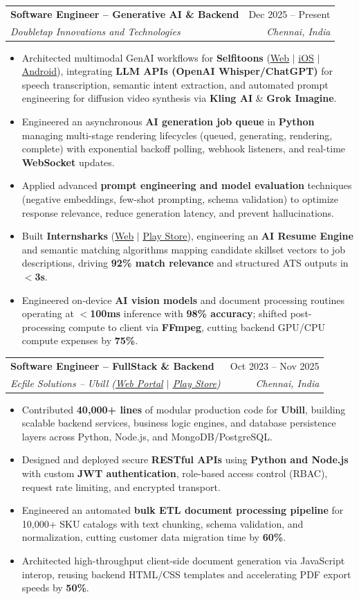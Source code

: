 \documentclass[letterpaper,10pt]{article}
\makeatletter
\newcommand{\resumeItem}[1]{
  \item\small{
    {#1 \vspace{-2pt}}
  }
}
\newcommand{\resumeSubheading}[4]{
  \vspace{-2pt}\item
    \begin{tabular*}{0.97\textwidth}[t]{l@{\extracolsep{\fill}}r}
      \textbf{#1} & #2 \\
      \textit{\small#3} & \textit{\small #4} \\
    \end{tabular*}\vspace{-6pt}
}
\newcommand{\resumeItemListStart}{\begin{itemize}}
\newcommand{\resumeItemListEnd}{\end{itemize}\vspace{-5pt}}
\makeatother
\begin{document}
    \resumeSubheading
      {Software Engineer -- Generative AI \& Backend}{Dec 2025 -- Present}
      {Doubletap Innovations and Technologies}{Chennai, India}
      \resumeItemListStart
        \resumeItem{Architected multimodal GenAI workflows for \textbf{Selfitoons} (\href{https://selfitoons.ai/}{\underline{Web}} $|$ \href{https://apps.apple.com/in/app/selfitoons/id6758597947}{\underline{iOS}} $|$ \href{https://play.google.com/store/apps/details?id=com.doubletap.ai.selfitoons}{\underline{Android}}), integrating \textbf{LLM APIs (OpenAI Whisper/ChatGPT)} for speech transcription, semantic intent extraction, and automated prompt engineering for diffusion video synthesis via \textbf{Kling AI} \& \textbf{Grok Imagine}.}
        \resumeItem{Engineered an asynchronous \textbf{AI generation job queue} in \textbf{Python} managing multi-stage rendering lifecycles (queued, generating, rendering, complete) with exponential backoff polling, webhook listeners, and real-time \textbf{WebSocket} updates.}
        \resumeItem{Applied advanced \textbf{prompt engineering and model evaluation} techniques (negative embeddings, few-shot prompting, schema validation) to optimize response relevance, reduce generation latency, and prevent hallucinations.}
        \resumeItem{Built \textbf{Internsharks} (\href{https://internsharks.ai/}{\underline{Web}} $|$ \href{https://play.google.com/store/apps/details?id=com.doubletap.internsharks.ai}{\underline{Play Store}}), engineering an \textbf{AI Resume Engine} and semantic matching algorithms mapping candidate skillset vectors to job descriptions, driving \textbf{92\% match relevance} and structured ATS outputs in \textbf{$<$3s}.}
        \resumeItem{Engineered on-device \textbf{AI vision models} and document processing routines operating at \textbf{$<$100ms} inference with \textbf{98\% accuracy}; shifted post-processing compute to client via \textbf{FFmpeg}, cutting backend GPU/CPU compute expenses by \textbf{75\%}.}
      \resumeItemListEnd

    \resumeSubheading
      {Software Engineer -- FullStack \& Backend}{Oct 2023 -- Nov 2025}
      {Ecfile Solutions -- Ubill (\href{https://app.ubill.tech/}{\underline{Web Portal}} $|$ \href{https://play.google.com/store/apps/details?id=com.ubill.tech}{\underline{Play Store}})}{Chennai, India}
      \resumeItemListStart
        \resumeItem{Contributed \textbf{40,000+ lines} of modular production code for \textbf{Ubill}, building scalable backend services, business logic engines, and database persistence layers across Python, Node.js, and MongoDB/PostgreSQL.}
        \resumeItem{Designed and deployed secure \textbf{RESTful APIs} using \textbf{Python and Node.js} with custom \textbf{JWT authentication}, role-based access control (RBAC), request rate limiting, and encrypted transport.}
        \resumeItem{Engineered an automated \textbf{bulk ETL document processing pipeline} for 10,000+ SKU catalogs with text chunking, schema validation, and normalization, cutting customer data migration time by \textbf{60\%}.}
        \resumeItem{Architected high-throughput client-side document generation via JavaScript interop, reusing backend HTML/CSS templates and accelerating PDF export speeds by \textbf{50\%}.}
      \resumeItemListEnd
\end{document}
